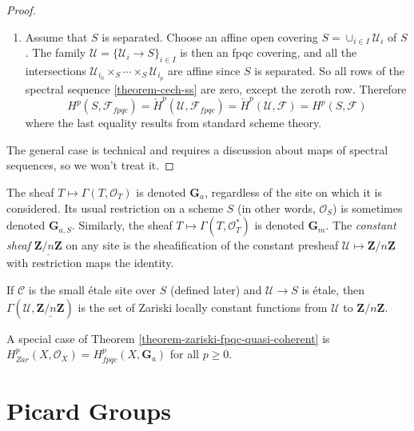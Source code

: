 \begin{proof}
\begin{enumerate}
\item
Assume that $S$ is separated. Choose an affine open covering $S = \cup_{i \in 
I} \mathcal{U}_i$ of $S$. The family $\mathcal{U} = \{ \mathcal{U}_i \to S 
\}_{i \in I}$ is then an fpqc covering, and all the intersections 
$\mathcal{U}_{i_0} \times_S \cdots \times_S \mathcal{U}_{i_p}$ are affine since 
$S$ is separated. So all rows of the spectral sequence 
\ref{theorem-cech-ss} are zero, except the zeroth row. Therefore
$$
H^p(S, \mathcal{F}_{fpqc}) =
\check H^p(\mathcal{U}, \mathcal{F}_{fpqc}) =
\check H^p(\mathcal{U}, \mathcal{F}) = H^p(S, \mathcal{F})
$$
where the last equality results from standard scheme theory.
\end{enumerate}
The general case is technical and requires a discussion about maps of spectral 
sequences, so we won't treat it.
\end{proof}

\begin{definition}
\label{definition-additive-sheaf}
The sheaf $T \mapsto \Gamma(T, \mathcal{O}_T)$ is denoted $\mathbf{G}_a$, 
regardless of the site on which it is considered. Its usual restriction on a 
scheme $S$ (in other words, $\mathcal{O}_S$) is sometimes denoted 
$\mathbf{G}_{a,S}$.
Similarly, the sheaf $T \mapsto \Gamma(T, \mathcal{O}^*_T)$ is denoted
$\mathbf{G}_m$.
The {\it constant sheaf} $\underline{\mathbf{Z}/n\mathbf{Z}}$ on any site is 
the sheafification of the constant presheaf $\mathcal{U} \mapsto 
\mathbf{Z}/n\mathbf{Z}$ with restriction maps the identity.
\end{definition}

\begin{remark}
\label{remark-constant-locally-constant-maps}
If $\mathcal{C}$ is the small \'etale site over $S$ (defined later) and 
$\mathcal{U} \to S$ is \'etale, then $\Gamma(\mathcal{U}, 
\underline{\mathbf{Z}/n\mathbf{Z}})$ is the set of Zariski locally constant 
functions from $\mathcal{U}$ to $\mathbf{Z}/n\mathbf{Z}$.
\end{remark}

\begin{remark}
\label{remark-special-case-fpqc-cohomology-quasi-coherent}
A special case of Theorem \ref{theorem-zariski-fpqc-quasi-coherent}
is $H_{Zar}^p (X, \mathcal{O}_X) = H_{fpqc}^p(X, \mathbf{G}_a)$
for all $p \geq 0$.
\end{remark}




\section{Picard Groups}
\label{section-picard-groups}

